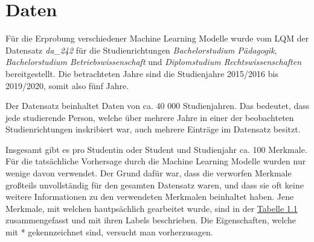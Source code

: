 

\section{Daten}
\label{sec:daten}

F\"ur die Erprobung verschiedener Machine Learning Modelle wurde vom LQM der Datensatz
\textit{da\_242} f\"ur die Studienrichtungen \textit{Bachelorstudium P\"adagogik},
\textit{Bachelorstudium Betriebswissenschaft} und \textit{Diplomstudium Rechtswissenschaften} bereitgestellt.
Die betrachteten Jahre sind die Studienjahre 2015/2016 bis 2019/2020, somit also f\"unf Jahre.

Der Datensatz beinhaltet Daten von ca. 40 000 Studienjahren. Das bedeutet, dass jede studierende Person,
welche \"uber mehrere Jahre in einer der beobachteten Studienrichtungen inskribiert war, auch mehrere Eintr\"age im Datensatz besitzt.

Insgesamt gibt es pro Studentin oder Student und Studienjahr ca. 100 Merkmale.
F\"ur die tats\"achliche Vorhersage durch die Machine Learning Modelle wurden nur wenige davon verwendet.
Der Grund daf\"ur war, dass die verworfen Merkmale gro{\ss}teils unvollst\"andig f\"ur den gesamten Datensatz waren,
und dass sie oft keine weitere Informationen zu den verwendeten Merkmalen beinhaltet haben. Jene Merkmale, mit welchen hautps\"achlich
gearbeitet wurde, sind in der \hyperref[tab:name]{Tabelle 1.1} zusammengefasst und mit ihren Labels beschrieben. Die Eigenschaften, welche mit
*  gekennzeichnet sind, versucht man vorherzusagen.

